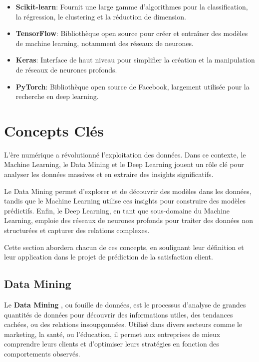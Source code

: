 \begin{itemize}
\begin{itemize}
        \item \textbf{Scikit-learn}: Fournit une large gamme d'algorithmes pour la classification, la régression, le clustering et la réduction de dimension.
        \item \textbf{TensorFlow}: Bibliothèque open source pour créer et entraîner des modèles de machine learning, notamment des réseaux de neurones.        \item \textbf{Keras}: Interface de haut niveau pour simplifier la création et la manipulation de réseaux de neurones profonds.
        \item \textbf{PyTorch}: Bibliothèque open source de Facebook, largement utilisée pour la recherche en deep learning.    \end{itemize}
\end{itemize}

\section{Concepts Clés}
L'ère numérique a révolutionné l'exploitation des données. Dans ce contexte, le Machine Learning, le Data Mining et le Deep Learning jouent un rôle clé pour analyser les données massives et en extraire des insights significatifs. 

Le Data Mining permet d'explorer et de découvrir des modèles dans les données, tandis que le Machine Learning utilise ces insights pour construire des modèles prédictifs. Enfin, le Deep Learning, en tant que sous-domaine du Machine Learning, emploie des réseaux de neurones profonds pour traiter des données non structurées et capturer des relations complexes.

Cette section abordera chacun de ces concepts, en soulignant leur définition et leur application dans le projet de prédiction de la satisfaction client.

\subsection{Data Mining}

Le \textbf{Data Mining} \cite{mining}, ou fouille de données, est le processus d'analyse de grandes quantités de données pour découvrir des informations utiles, des tendances cachées, ou des relations insoupçonnées. Utilisé dans divers secteurs comme le marketing, la santé, ou l'éducation, il permet aux entreprises de mieux comprendre leurs clients et d'optimiser leurs stratégies en fonction des comportements observés.

